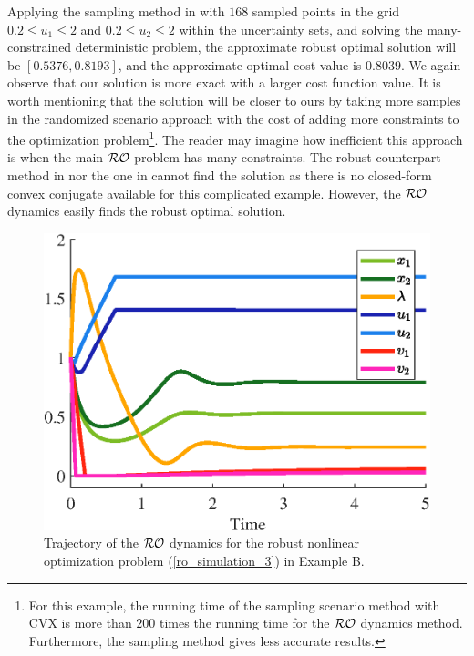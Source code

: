 \documentclass[journal,twoside,web]{ieeecolor}
\begin{document}
Applying the sampling method in \cite{calafiore2004} with $168$ sampled points in the grid $0.2 \leq u_1 \leq 2$ and $0.2 \leq u_2 \leq 2$ within the uncertainty sets, and solving the many-constrained deterministic problem, the approximate robust optimal solution will be $[0.5376, 0.8193]$, and the approximate optimal cost value is $0.8039$. We again observe that our solution is more exact with a larger cost function value. It is worth mentioning that the solution will be closer to ours by taking more samples in the randomized scenario approach with the cost of adding more constraints to the optimization problem\footnote{For this example, the running time of the sampling scenario method with CVX is more than $200$ times the running time for the ${\cal RO}$ dynamics method.
Furthermore, the sampling method gives less accurate results.}. The reader may imagine how inefficient this approach is when the main $\cal{RO}$ problem has many constraints. The robust counterpart method in \cite{bental2009} nor the one in \cite[~Table 1]{gorissen20152} cannot find the solution as there is no closed-form convex conjugate available for this complicated example. However, the ${\cal RO}$ dynamics easily finds the robust optimal solution.
\begin{figure}
\begin{center}
\includegraphics[scale=0.55]{trajectories_nonlinear_exp_no_RC.eps}
\caption{Trajectory of the ${\cal RO}$ dynamics for the robust nonlinear optimization problem (\ref{ro_simulation_3}) in Example B.}
\label{trajectories_nonlinear_exp_no_RC}
\end{center}
\end{figure}
\end{document}
